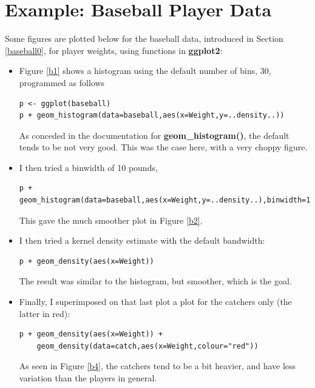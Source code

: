 
\section{Example:  Baseball Player Data}

Some figures are plotted below for the baseball data, introduced in
Section \ref{baseball0}, for player weights, using functions in {\bf
ggplot2}:

\begin{itemize}

\item Figure \ref{b1} shows a histogram using the default number of
bins, 30, programmed as follows

\begin{lstlisting}
p <- ggplot(baseball)
p + geom_histogram(data=baseball,aes(x=Weight,y=..density..))
\end{lstlisting}

As conceded in the documentation for {\bf geom\_histogram()}, the
default tends to be not very good.  This was the case here, with a very
choppy figure.

\item I then tried a binwidth of 10 pounds, 

\begin{lstlisting}
p + geom_histogram(data=baseball,aes(x=Weight,y=..density..),binwidth=10)
\end{lstlisting}

This gave the much smoother plot in Figure \ref{b2}.

\item I then tried a kernel density estimate with the default bandwidth:

\begin{lstlisting}
p + geom_density(aes(x=Weight)) 
\end{lstlisting}

The result was similar to the histogram, but smoother, which is the
goal.  

\item Finally, I superimposed on that last plot a plot for the catchers
only (the latter in red):

\begin{lstlisting}
p + geom_density(aes(x=Weight)) + 
    geom_density(data=catch,aes(x=Weight,colour="red"))
\end{lstlisting}

As seen in Figure \ref{b4}, the catchers tend to be a bit heavier, and
have less variation than the players in general.

\end{itemize}

